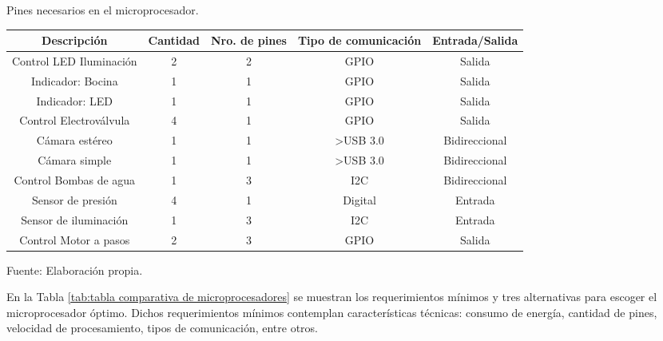 \begin{mytable}[H]
	\footnotesize\centering
	\caption{Pines necesarios en el microprocesador.}
	\label{tab:pines necesarios en el microprocesador}
	\begin{tabular}{|c|c|c|c|c|}
		\hline
		\textbf{Descripción} & \textbf{Cantidad} & \textbf{Nro. de pines} & \textbf{Tipo de comunicación} & \textbf{Entrada/Salida} \\ \hline
		Control LED Iluminación   & 2 & 2 & GPIO                  & Salida        \\ \hline
		Indicador: Bocina         & 1 & 1 & GPIO                  & Salida        \\ \hline
		Indicador: LED            & 1 & 1 & GPIO                  & Salida        \\ \hline
		Control Electroválvula    & 4 & 1 & GPIO                  & Salida        \\ \hline
		Cámara estéreo            & 1 & 1 & \textgreater{}USB 3.0 & Bidireccional \\ \hline
		Cámara simple             & 1 & 1 & \textgreater{}USB 3.0 & Bidireccional \\ \hline
		Control Bombas de agua    & 1 & 3 & I2C                   & Bidireccional \\ \hline
		Sensor de presión         & 4 & 1 & Digital               & Entrada       \\ \hline
		Sensor de iluminación     & 1 & 3 & I2C                   & Entrada        \\ \hline
		Control Motor a pasos     & 2 & 3 & GPIO                  & Salida        \\ \hline
	\end{tabular}
	\begin{myflushcenteraftertable}	
		Fuente: Elaboración propia.
	\end{myflushcenteraftertable}
\end{mytable}

En la Tabla \ref{tab:tabla comparativa de microprocesadores} se muestran los requerimientos mínimos y tres alternativas para escoger el microprocesador óptimo. Dichos requerimientos mínimos contemplan características técnicas: consumo de energía, cantidad de pines, velocidad de procesamiento, tipos de comunicación, entre otros.

